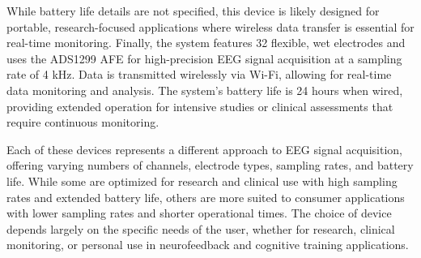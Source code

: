 While battery life details are not specified, this device is likely designed for portable, research-focused applications where wireless data transfer is essential for real-time monitoring. Finally, the \cite{Beats} system features 32 flexible, wet electrodes and uses the ADS1299 AFE for high-precision EEG signal acquisition at a sampling rate of 4 kHz. Data is transmitted wirelessly via Wi-Fi, allowing for real-time data monitoring and analysis. The system’s battery life is 24 hours when wired, providing extended operation for intensive studies or clinical assessments that require continuous monitoring.

Each of these devices represents a different approach to EEG signal acquisition, offering varying numbers of channels, electrode types, sampling rates, and battery life. While some are optimized for research and clinical use with high sampling rates and extended battery life, others are more suited to consumer applications with lower sampling rates and shorter operational times. The choice of device depends largely on the specific needs of the user, whether for research, clinical monitoring, or personal use in neurofeedback and cognitive training applications.




